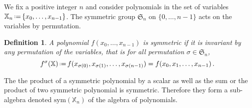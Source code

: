 \documentclass[12pt]{article}
\newcommand{\SG}{{\mathfrak S}}
\newcommand{\sym}{\mathrm{sym}}
\newcommand{\eqdef}{\mbox{\,\raisebox{0.2ex}{\scriptsize\ensuremath{\mathrm:}}\ensuremath{=}\,}} %
\newcommand{\alphX}{{\mathbb X}}
\newtheorem{DEFN}{Definition}
\begin{document}
We fix a positive integer $n$ and consider polynomials in the set of variables
$\alphX_n\eqdef\{x_0,\dots,x_{n-1}\}$. The symmetric group $\SG_n$ on
$\{0,\dots,n-1\}$ acts on the variables by permutation.
\begin{DEFN}
 A polynomial $f(x_0,\dots,x_{n-1})$ is symmetric if it is invariant by any
 permutation of the variables, that is for all permutation $\sigma\in\SG_n$,
 \begin{equation}
   f^\sigma(\alphX)\eqdef f(x_{\sigma(0)}, x_{\sigma(1)}, \dots, x_{\sigma(n-1)}) = 
   f(x_{0}, x_{1}, \dots, x_{n-1})\,.
 \end{equation}
\end{DEFN}
The the product of a symmetric polynomial by a scalar as well as the sum or
the product of two symmetric polynomial is symmetric. Therefore they form a
sub-algebra denoted $\sym(\alphX_n)$ of the algebra of polynomials.
\end{document}
